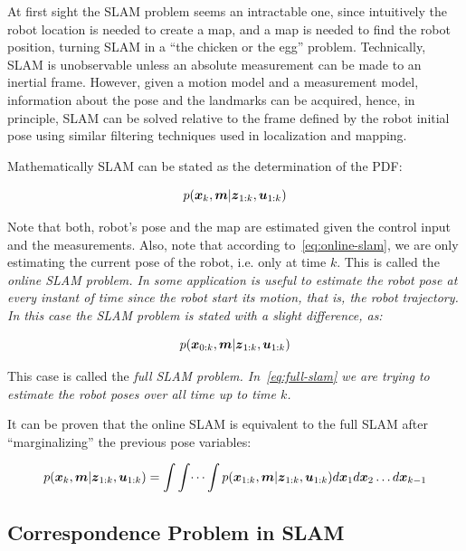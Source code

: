 At first sight the SLAM problem seems an intractable one, since intuitively the robot location is needed to create a map, and a map is needed to find the robot position, turning SLAM in a ``the chicken or the egg'' problem. Technically, SLAM is unobservable unless an absolute measurement can be made to an inertial frame. However, given a motion model and a measurement model, information about the pose and the landmarks can be acquired, hence, in principle, SLAM can be solved relative to the frame defined by the robot initial pose using similar filtering techniques used in localization and mapping.

Mathematically SLAM can be stated as the determination of the PDF:

\begin{equation}
p(\boldsymbol{x}_k,\boldsymbol{m}|\boldsymbol{z}_{1:k},\boldsymbol{u}_{1:k})
\label{eq:online-slam}
\end{equation} 

\noindent
Note that both, robot's pose and the map are estimated given the control input and the measurements. Also, note that according to~\eqref{eq:online-slam}, we are only estimating the current pose of the robot, i.e. only at time $k$. This is called the \it{online SLAM} problem. In some application is useful to estimate the robot pose at every instant of time since the robot start its motion, that is, the robot trajectory. In this case the SLAM problem is stated with a slight difference, as:

\begin{equation}
p(\boldsymbol{x}_{0:k},\boldsymbol{m}|\boldsymbol{z}_{1:k},\boldsymbol{u}_{1:k})
\label{eq:full-slam}
\end{equation} 

This case is called the \it{full SLAM} problem. In~\eqref{eq:full-slam} we are trying to estimate the robot poses over all time up to time $k$. 

It can be proven that the online SLAM is equivalent to the full SLAM after ``marginalizing'' the previous pose variables:

\begin{equation}
p(\boldsymbol{x}_k,\boldsymbol{m}|\boldsymbol{z}_{1:k},\boldsymbol{u}_{1:k}) = \int \int \dots \int 
p(\boldsymbol{x}_{1:k},\boldsymbol{m}|\boldsymbol{z}_{1:k},\boldsymbol{u}_{1:k}) d\boldsymbol{x}_1 d\boldsymbol{x}_2 \dots d\boldsymbol{x}_{k-1}
\end{equation}

\subsection{Correspondence Problem in SLAM}

